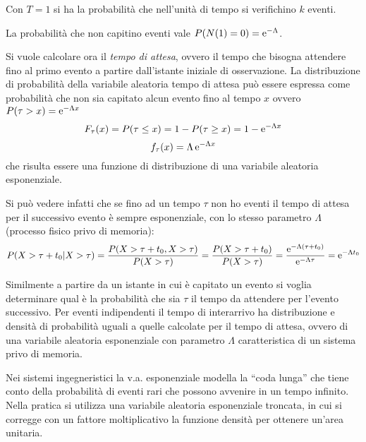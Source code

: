 Con $T=1$ si ha la probabilità che nell'unità di tempo si verifichino $k$ eventi.

La probabilità che non capitino eventi vale $P(N(1)=0)=\operatorname{e}^{-\Lambda}$.

Si vuole calcolare ora il \emph{tempo di attesa}, ovvero il tempo che bisogna attendere fino al primo evento a partire dall'istante iniziale di osservazione. La distribuzione di probabilità della variabile aleatoria tempo di attesa può essere espressa come probabilità che non sia capitato alcun evento fino al tempo $x$ ovvero $P(\tau>x)=\operatorname{e}^{-\Lambda x}$
\begin{equation}
	F_\tau(x)=P(\tau\leq x)=1-P(\tau\geq x)=1-\operatorname{e}^{-\Lambda x}
\end{equation}
\begin{equation}
	f_\tau(x)=\Lambda\operatorname{e}^{-\Lambda x}
\end{equation}
che risulta essere una funzione di distribuzione di una variabile aleatoria esponenziale.

Si può vedere infatti che se fino ad un tempo $\tau$ non ho eventi il tempo di attesa per il successivo evento è sempre esponenziale, con lo stesso parametro $\Lambda$ (processo fisico privo di memoria):
\[
	P(X>\tau+t_0|X>\tau)=\frac{P(X>\tau+t_0,X>\tau)}{P(X>\tau)}=\frac{P(X>\tau+t_0)}{P(X>\tau)}=\frac{\operatorname{e}^{-\Lambda(\tau+t_0)}}{\operatorname{e}^{-\Lambda\tau}}=\operatorname{e}^{-\Lambda t_0}
\]

Similmente a partire da un istante in cui è capitato un evento si voglia determinare qual è la probabilità che sia $\tau$ il tempo da attendere per l'evento successivo. Per eventi indipendenti il tempo di interarrivo ha distribuzione e densità di probabilità uguali a quelle calcolate per il tempo di attesa, ovvero di una variabile aleatoria esponenziale con parametro $\Lambda$ caratteristica di un sistema privo di memoria.

\begin{nota}
	Nei sistemi ingegneristici la v.a. esponenziale modella la “coda lunga” che tiene conto della probabilità di eventi rari che possono avvenire in un tempo infinito. Nella pratica si utilizza una variabile aleatoria esponenziale troncata, in cui si corregge con un fattore moltiplicativo la funzione densità per ottenere un'area unitaria.
\end{nota}

